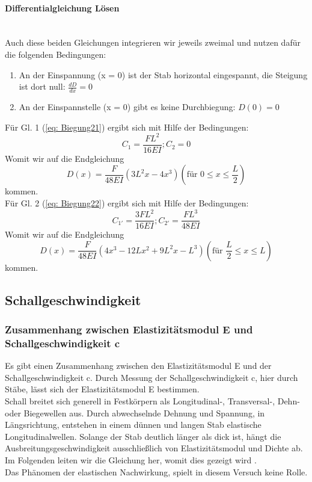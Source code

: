 \paragraph{Differentialgleichung Lösen}\mbox{}\\
Auch diese beiden Gleichungen integrieren wir jeweils zweimal und nutzen dafür die folgenden Bedingungen:\\ 
\begin{enumerate}
    \item An der Einspannung (x = 0) ist der Stab horizontal eingespannt, die Steigung ist dort null: $\frac{dD}{dx} = 0 $
    \item An der Einspannstelle (x = 0) gibt es keine Durchbiegung: $D(0)=0$
\end{enumerate}
Für Gl. 1 (\ref{eq: Biegung21}) ergibt sich mit Hilfe der Bedingungen:\\
\begin{equation}
  C_1 = \frac{FL^2}{16EI} ;  C_2 = 0 
\end{equation}
Womit wir auf die Endgleichung \\
\begin{equation}
  D(x) = \frac{F}{48EI} (3 L^2 x - 4x^3) (\text{für }  0 \leq x \leq \frac{L}{2}) 
\end{equation}
kommen.\\
Für Gl. 2 (\ref{eq: Biegung22}) ergibt sich mit Hilfe der Bedingungen:
\begin{equation}
  C_{1'} = \frac{3FL^2}{16EI} ;  C_{2'} =  \frac{FL^3}{48EI}
\end{equation}
Womit wir auf die Endgleichung \\
\begin{equation}
  D(x) = \frac{F}{48EI} (4x^3 - 12Lx^2 + 9L^2 x - L^3) (\text{für } \frac{L}{2} \leq x \leq L) 
\end{equation}
kommen.\\
\subsection{Schallgeschwindigkeit}
\subsubsection{Zusammenhang zwischen Elastizitätsmodul E und Schallgeschwindigkeit c}
Es gibt einen Zusammenhang zwischen den Elastizitätsmodul E und der Schallgeschwindigkeit c. Durch Messung der Schallgeschwindigkeit c, hier durch Stäbe, lässt sich der Elastizitätsmodul E bestimmen.\\
Schall breitet sich generell in Festkörpern als Longitudinal-, Transversal-, Dehn- oder Biegewellen aus. Durch abwechselnde Dehnung und Spannung, in Längsrichtung, entstehen in einem dünnen und langen Stab elastische Longitudinalwellen. Solange der Stab deutlich länger als dick ist, hängt die Ausbreitungsgeschwindigkeit ausschließlich von Elastizitätsmodul und Dichte ab. Im Folgenden leiten wir die Gleichung her, womit dies gezeigt wird \cite{Schallwellen}.\\
Das Phänomen der elastischen Nachwirkung, spielt in diesem Versuch keine Rolle. \\
